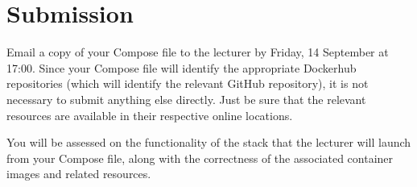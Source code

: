 \documentclass{article}
\begin{document}
\section{Submission}
Email a copy of your Compose file to the lecturer by Friday, 14 September at 17:00.  Since your Compose file will identify the appropriate Dockerhub repositories (which will identify the relevant GitHub repository), it is not necessary to submit anything else directly. Just be sure that the relevant resources are available in their respective online locations.

You will be assessed on the functionality of the stack that the lecturer will launch from your Compose file, along with the correctness of the associated container images and related resources.
\end{document}
